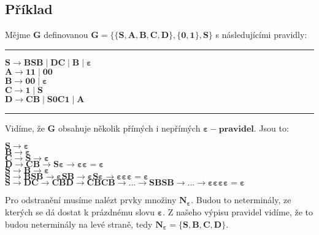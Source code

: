 \documentclass{report}
\begin{document}
\subsection*{Příklad}
Mějme \textbf{G} definovanou $\mathbf{G = \{\{S,A,B,C,D\},\{0,1\},S\}}$ s následujícími pravidly:
\vspace{0.4cm}    
\hrule
\vspace{0.1cm}
\begin{description}
    \item[$\mathbf{S \rightarrow BSB \mid DC \mid B \mid \varepsilon}$]
    \item[$\mathbf{A \rightarrow 11 \mid 00}$]
    \item[$\mathbf{B \rightarrow 00 \mid \varepsilon}$]
    \item[$\mathbf{C \rightarrow 1 \mid S}$]
    \item[$\mathbf{D \rightarrow CB \mid S0C1 \mid A}$]
\end{description}
\vspace{0.1cm}    
\hrule
\vspace{0.4cm} 
Vidíme, že \textbf{G} obsahuje několik přímých i nepřímých $\mathbf{\varepsilon-pravidel}$. Jsou to:
\begin{description}
    \item[$\mathbf{S \rightarrow \varepsilon}$]
    \item[$\mathbf{B \rightarrow \varepsilon}$]
    \item[$\mathbf{C \rightarrow S \rightarrow \varepsilon}$]
    \item[$\mathbf{D \rightarrow CB \rightarrow S\varepsilon \rightarrow \varepsilon\varepsilon = \varepsilon}$]
    \item[$\mathbf{S \rightarrow B \rightarrow \varepsilon}$]
    \item[$\mathbf{S \rightarrow BSB \rightarrow \varepsilon{SB} \rightarrow \varepsilon{S}\varepsilon \rightarrow \varepsilon\varepsilon\varepsilon=\varepsilon}$]
    \item[$\mathbf{S \rightarrow DC \rightarrow CBD \rightarrow CBCB \rightarrow ... \rightarrow SBSB \rightarrow ... \rightarrow \varepsilon\varepsilon\varepsilon\varepsilon = \varepsilon}$]
\end{description}
Pro odstranění musíme nalézt prvky množiny $\mathbf{N_{\varepsilon}}$. Budou to neterminály, ze kterých se dá dostat k prázdnému slovu $\mathbf{\varepsilon}$. Z našeho výpisu pravidel vidíme, že to budou neterminály na levé straně, tedy $\mathbf{N_{\varepsilon}=\{S,B,C,D\}}$.\\ \\
\end{document}
